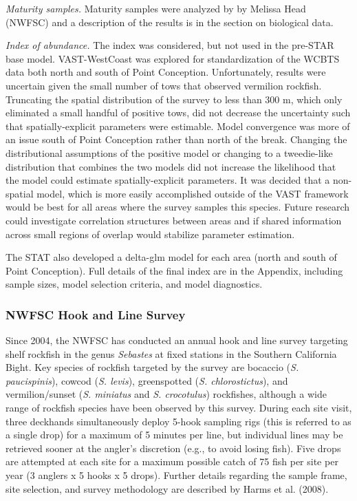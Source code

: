\documentclass[11pt,
  english,
]{article}
\begin{document}
\emph{Maturity samples.} Maturity samples were analyzed by by Melissa Head (NWFSC) and a description of the results is in the section on biological data.

\emph{Index of abundance.} The index was considered, but not used in the pre-STAR base model. VAST-WestCoast was explored for standardization of the WCBTS data both north and south of Point Conception. Unfortunately, results were uncertain given the small number of tows that observed vermilion rockfish. Truncating the spatial distribution of the survey to less than 300 m, which only eliminated a small handful of positive tows, did not decrease the uncertainty such that spatially-explicit parameters were estimable. Model convergence was more of an issue south of Point Conception rather than north of the break. Changing the distributional assumptions of the positive model or changing to a tweedie-like distribution that combines the two models did not increase the likelihood that the model could estimate spatially-explicit parameters. It was decided that a non-spatial model, which is more easily accomplished outside of the VAST framework would be best for all areas where the survey samples this species. Future research could investigate correlation structures between areas and if shared information across small regions of overlap would stabilize parameter estimation.

The STAT also developed a delta-glm model for each area (north and south of Point Conception). Full details of the final index are in the Appendix, including sample sizes, model selection criteria, and model diagnostics.


\hypertarget{nwfsc-hook-and-line-survey}{%
\subsubsection{NWFSC Hook and Line Survey}\label{nwfsc-hook-and-line-survey}}

\leavevmode\tagmcend\tagstructend

Since 2004, the NWFSC has conducted an annual hook and line survey targeting shelf rockfish in the genus \emph{Sebastes} at fixed stations in the Southern California Bight. Key species of rockfish targeted by the survey are bocaccio (\emph{S. paucispinis}), cowcod (\emph{S. levis}), greenspotted (\emph{S. chlorostictus}), and vermilion/sunset (\emph{S. miniatus} and \emph{S. crocotulus}) rockfishes, although a wide range of rockfish species have been observed by this survey. During each site visit, three deckhands simultaneously deploy 5-hook sampling rigs (this is referred to as a single drop) for a maximum of 5 minutes per line, but individual lines may be retrieved sooner at the angler's discretion (e.g., to avoid losing fish). Five drops are attempted at each site for a maximum possible catch of 75 fish per site per year (3 anglers x 5 hooks x 5 drops). Further details regarding the sample frame, site selection, and survey methodology are described by Harms et al. {(2008)\leavevmode\tagmcend\tagstructend}.
\end{document}
